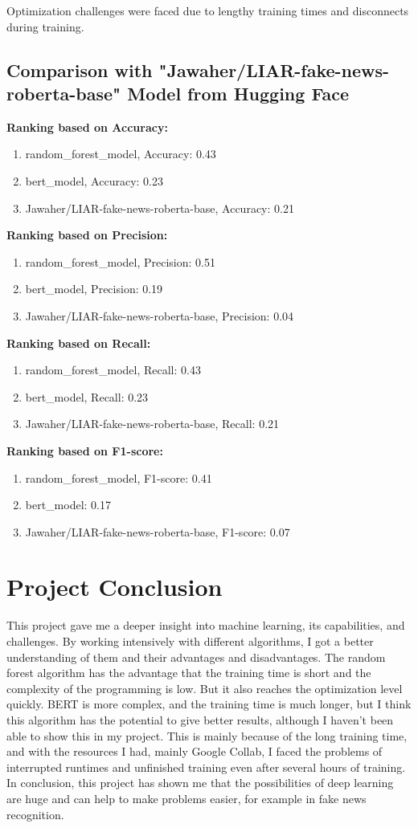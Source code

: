 \documentclass{article}
\begin{document}
Optimization challenges were faced due to lengthy training times and disconnects during training.

\subsection*{Comparison with "Jawaher/LIAR-fake-news-roberta-base" Model from Hugging Face}
\textbf{Ranking based on Accuracy:}
\begin{enumerate}
  \item random\_forest\_model, Accuracy: 0.43
  \item bert\_model, Accuracy: 0.23
  \item Jawaher/LIAR-fake-news-roberta-base, Accuracy: 0.21
\end{enumerate}

\textbf{Ranking based on Precision:}
\begin{enumerate}
  \item random\_forest\_model, Precision: 0.51
  \item bert\_model, Precision: 0.19
  \item Jawaher/LIAR-fake-news-roberta-base, Precision: 0.04
\end{enumerate}

\textbf{Ranking based on Recall:}
\begin{enumerate}
  \item random\_forest\_model, Recall: 0.43
  \item bert\_model, Recall: 0.23
  \item Jawaher/LIAR-fake-news-roberta-base, Recall: 0.21
\end{enumerate}

\textbf{Ranking based on F1-score:}
\begin{enumerate}
  \item random\_forest\_model, F1-score: 0.41
  \item bert\_model: 0.17
  \item Jawaher/LIAR-fake-news-roberta-base, F1-score: 0.07
\end{enumerate}

\section*{Project Conclusion}
This project gave me a deeper insight into machine learning, its capabilities, and challenges. By working intensively with different algorithms, I got a better understanding of them and their advantages and disadvantages. The random forest algorithm has the advantage that the training time is short and the complexity of the programming is low. But it also reaches the optimization level quickly. BERT is more complex, and the training time is much longer, but I think this algorithm has the potential to give better results, although I haven't been able to show this in my project. This is mainly because of the long training time, and with the resources I had, mainly Google Collab, I faced the problems of interrupted runtimes and unfinished training even after several hours of training. In conclusion, this project has shown me that the possibilities of deep learning are huge and can help to make problems easier, for example in fake news recognition.
\end{document}
